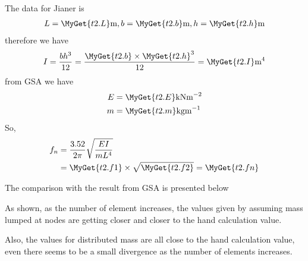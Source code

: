 \def\g#1{\MyGet{t2.#1}}
The data for Jianer is
\def\m{\text{m}}
\begin{align*}
L = \g{L} \m , b = \g{b} \m , h = \g{h} \m
\end{align*}
therefore we have
\begin{align*}
I = \frac{bh^3}{12} = \frac{\g{b} \times \g{h}^3}{12} = \g{I} \text{m}^4
\end{align*}
from GSA we have
\begin{align*}
  E &= \g{E} \text{kNm}^{-2} \\
  m &= \g{m} \text{kgm}^{-1}
\end{align*}
So,
\begin{align*}
  f_n &= \frac{3.52}{2\pi}\sqrt{\frac{EI}{mL^4}} \\
  &= \g{f1} \times \sqrt{\g{f2}} = \g{fn}
\end{align*}

The comparison with the result from GSA is presented below

As shown, as the number of element increases, the values given by assuming
mass lumped at nodes are getting closer and closer to the hand calculation value.

Also, the values for distributed mass are all close to the hand calculation
value, even there seems to be a small divergence as the number of elements
increases.

